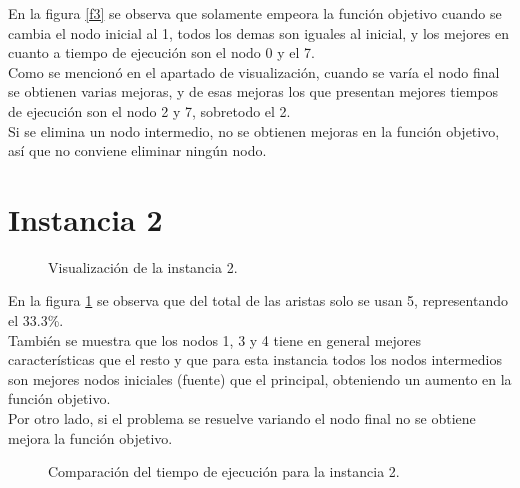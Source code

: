 \documentclass[12pt]{article}
\begin{document}
En la figura \ref{f3} se observa que solamente empeora la función objetivo cuando se cambia el nodo inicial al 1, todos los demas son iguales al inicial, y los mejores en cuanto a tiempo de ejecución son el nodo 0 y el 7. \\

Como se mencionó en el apartado de visualización, cuando se varía el nodo final se obtienen varias mejoras, y de esas mejoras los que presentan mejores tiempos de ejecución son el nodo 2 y 7, sobretodo el 2.\\

Si se elimina un nodo intermedio, no se obtienen mejoras en la función objetivo, así que no conviene eliminar ningún nodo.

\newpage
\section*{Instancia 2}

\begin{figure}[H]
\centering
{}

\caption{Visualización de la instancia 2.} \label{f4}
\end{figure}

En la figura \ref{f4} se observa que del total de las aristas solo se usan 5, representando el 33.3\%. \\

También se muestra que los nodos 1, 3 y 4 tiene en general mejores características que el resto y que para esta instancia todos los nodos intermedios son mejores nodos iniciales (fuente) que el principal, obteniendo un aumento en la función objetivo. \\

Por otro lado, si el problema se resuelve variando el nodo final no se obtiene mejora la función objetivo.

\newpage

\begin{figure}[H]
\centering
{}

\caption{Comparación del tiempo de ejecución para la instancia 2.} \label{f5}
\end{figure}
\end{document}
